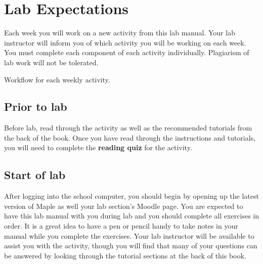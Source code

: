 \section{Lab Expectations}
\label{sec:lab_expectations}

Each week you will work on a new activity from this lab manual. Your lab instructor will inform you of which activity you will be working on each week. You must complete each component of each activity individually. Plagiarism of lab work will not be tolerated.

\begin{marginfigure}
    \centering
    \caption{Workflow for each weekly activity.}
\end{marginfigure}

\subsection*{Prior to lab} 
Before lab, read through the activity as well as the recommended tutorials from the back of the book. Once you have read through the instructions and tutorials, you will need to complete the \textbf{reading quiz} for the activity.


\subsection*{Start of lab}
After logging into the school computer, you should begin by opening up the latest version of Maple as well your lab section's Moodle page. You are expected to have this lab manual with you during lab and you should complete all exercises in order. It is a great idea to have a pen or pencil handy to take notes in your manual while you complete the exercises. Your lab instructor will be available to assist you with the activity, though you will find that many of your questions can be answered by looking through the tutorial sections at the back of this book.

